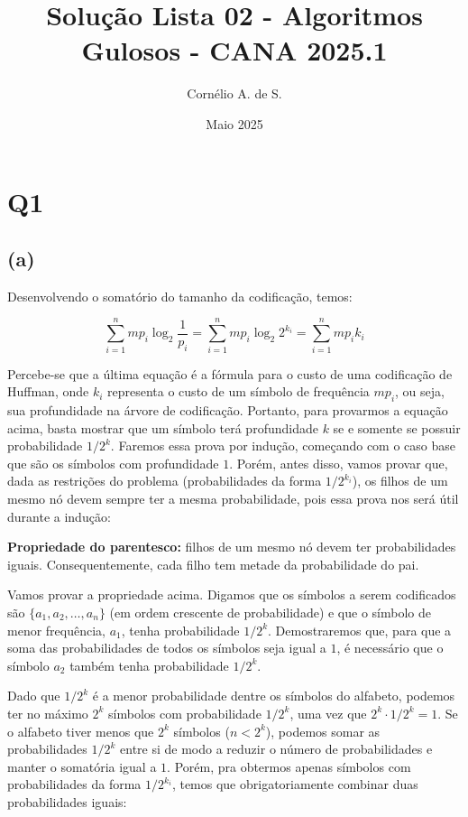 \documentclass[12pt, a4paper]{article}
\title{Solução Lista 02 - Algoritmos Gulosos - CANA 2025.1}
\author{Cornélio A. de S.}
\date{Maio 2025}
\begin{document}
\maketitle


\section*{Q1}

\subsection*{(a)}

Desenvolvendo o somatório do tamanho da codificação, temos:

\[
\sum_{i=1}^{n} mp_i \log_{2}{\frac{1}{p_i}}
= \sum_{i=1}^{n} mp_i \log_{2}{2^{k_i}}
= \sum_{i=1}^{n} mp_i k_i
\]

Percebe-se que a última equação é a fórmula para o custo de uma codificação de Huffman, onde $k_i$ representa o custo de um símbolo de frequência $mp_i$, ou seja, sua profundidade na árvore de codificação. Portanto, para provarmos a equação acima, basta mostrar que um símbolo terá profundidade $k$ se e somente se possuir probabilidade $1/2^k$. Faremos essa prova por indução, começando com o caso base que são os símbolos com profundidade $1$. Porém, antes disso, vamos provar que, dada as restrições do problema (probabilidades da forma $1/2^{k_i}$), os filhos de um mesmo nó devem sempre ter a mesma probabilidade, pois essa prova nos será útil durante a indução:

\textbf{Propriedade do parentesco:} filhos de um mesmo nó devem ter probabilidades iguais. Consequentemente, cada filho tem metade da probabilidade do pai.

Vamos provar a propriedade acima. Digamos que os símbolos a serem codificados são $\{ a_1, a_2, \ldots, a_n \}$ (em ordem crescente de probabilidade) e que o símbolo de menor frequência, $a_1$, tenha probabilidade $1/2^k$. Demostraremos que, para que a soma das probabilidades de todos os símbolos seja igual a $1$, é necessário que o símbolo $a_2$ também tenha probabilidade $1/2^k$.

Dado que $1/2^k$ é a menor probabilidade dentre os símbolos do alfabeto, podemos ter no máximo $2^k$ símbolos com probabilidade $1/2^k$, uma vez que $2^k \cdot 1/2^k = 1$. Se o alfabeto tiver menos que $2^k$ símbolos ($n < 2^k$), podemos somar as probabilidades $1/2^k$ entre si de modo a reduzir o número de probabilidades e manter o somatória igual a $1$. Porém, pra obtermos apenas símbolos com probabilidades da forma $1/2^{k_i}$, temos que obrigatoriamente combinar duas probabilidades iguais:
\end{document}
